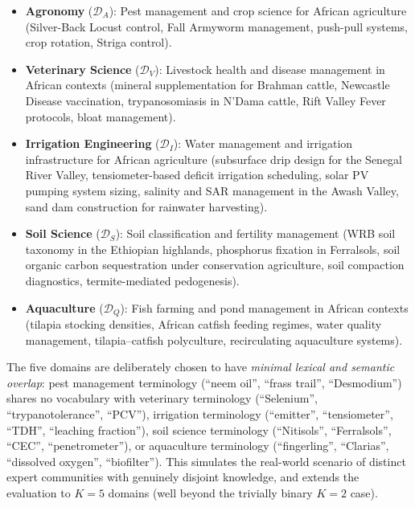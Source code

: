 \documentclass[conference, 10pt]{IEEEtran}
\begin{document}
\begin{itemize}
    \item \textbf{Agronomy} ($\mathcal{D}_A$): Pest management and crop
          science for African agriculture (Silver-Back Locust control,
          Fall Armyworm management, push-pull systems, crop rotation,
          Striga control).
    \item \textbf{Veterinary Science} ($\mathcal{D}_V$): Livestock health
          and disease management in African contexts (mineral
          supplementation for Brahman cattle, Newcastle Disease vaccination,
          trypanosomiasis in N'Dama cattle, Rift Valley Fever protocols,
          bloat management).
    \item \textbf{Irrigation Engineering} ($\mathcal{D}_I$): Water
          management and irrigation infrastructure for African agriculture
          (subsurface drip design for the Senegal River Valley,
          tensiometer-based deficit irrigation scheduling, solar PV
          pumping system sizing, salinity and SAR management in the
          Awash Valley, sand dam construction for rainwater harvesting).
    \item \textbf{Soil Science} ($\mathcal{D}_S$): Soil classification
          and fertility management (WRB soil taxonomy in the Ethiopian
          highlands, phosphorus fixation in Ferralsols, soil organic
          carbon sequestration under conservation agriculture, soil
          compaction diagnostics, termite-mediated pedogenesis).
    \item \textbf{Aquaculture} ($\mathcal{D}_Q$): Fish farming and
          pond management in African contexts (tilapia stocking densities,
          African catfish feeding regimes, water quality management,
          tilapia--catfish polyculture, recirculating aquaculture systems).
\end{itemize}

\noindent The five domains are deliberately chosen to have \emph{minimal
lexical and semantic overlap}: pest management terminology (``neem oil'',
``frass trail'', ``Desmodium'') shares no vocabulary with veterinary
terminology (``Selenium'', ``trypanotolerance'', ``PCV''), irrigation
terminology (``emitter'', ``tensiometer'', ``TDH'', ``leaching fraction''),
soil science terminology (``Nitisols'', ``Ferralsols'', ``CEC'',
``penetrometer''), or aquaculture terminology (``fingerling'',
``Clarias'', ``dissolved oxygen'', ``biofilter'').
This simulates the real-world scenario of distinct expert communities
with genuinely disjoint knowledge, and extends the evaluation to
$K=5$ domains (well beyond the trivially binary $K=2$ case).
\end{document}
